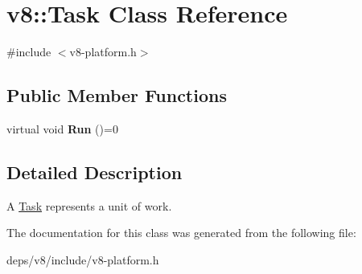 \hypertarget{classv8_1_1_task}{}\section{v8\+:\+:Task Class Reference}
\label{classv8_1_1_task}


{\ttfamily \#include $<$v8-\/platform.\+h$>$}

\subsection*{Public Member Functions}
\begin{DoxyCompactItemize}
\item 
\hypertarget{classv8_1_1_task_a6bd5bda0e357fcc2e727bf7b0170f99a}{}virtual void {\bfseries Run} ()=0\label{classv8_1_1_task_a6bd5bda0e357fcc2e727bf7b0170f99a}

\end{DoxyCompactItemize}


\subsection{Detailed Description}
A \hyperlink{classv8_1_1_task}{Task} represents a unit of work. 

The documentation for this class was generated from the following file\+:\begin{DoxyCompactItemize}
\item 
deps/v8/include/v8-\/platform.\+h\end{DoxyCompactItemize}
